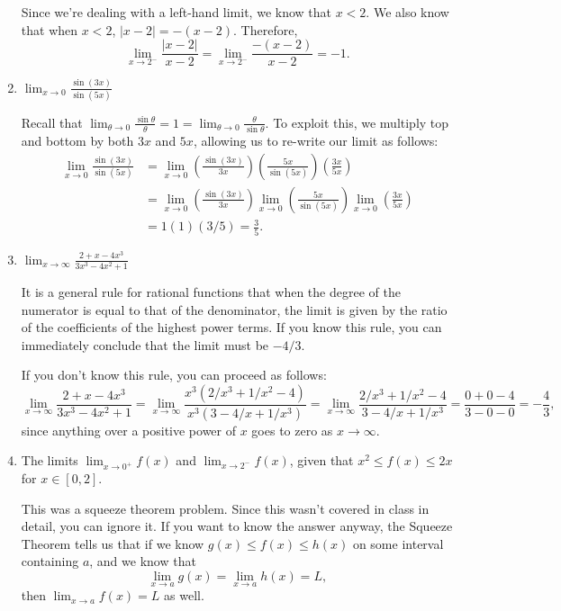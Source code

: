 \documentclass[12pt]{article}
\newcommand{\di}{\displaystyle}
\newcommand{\abs}[1]{\lvert #1\rvert}
\begin{document}
\begin{enumerate}
   Since we're dealing with a left-hand limit, we know that $x<2$. We also know that when $x<2$, $\abs{x-2}=-(x-2)$. Therefore,
   \[
   \lim_{x\to 2^-}\frac{\abs{x-2}}{x-2} = \lim_{x\to 2^-}\frac{-(x-2)}{x-2}=-1.
   \]
    
    \item $\di \lim_{x\to 0}\frac{\sin(3x)}{\sin(5x)}$
    
  Recall that $\di \lim_{\theta\to 0}\frac{\sin\theta}{\theta} = 1 = \lim_{\theta\to 0}\frac{\theta}{\sin\theta}$. To exploit this, we multiply top and bottom by both $3x$ and $5x$, allowing us to re-write our limit as follows:
  \begin{align*}
  \lim_{x\to 0}\frac{\sin(3x)}{\sin(5x)} &= \lim_{x\to 0}\left(\frac{\sin(3x)}{3x}\right)\left(\frac{5x}{\sin(5x)}\right)\left(\frac{3x}{5x}\right)\\
  & = \lim_{x\to 0}\left(\frac{\sin(3x)}{3x}\right)\lim_{x\to 0}\left(\frac{5x}{\sin(5x)}\right)\lim_{x\to 0}\left(\frac{3x}{5x}\right)\\
  & = 1(1)(3/5)=\frac35.
  \end{align*}
    
       
    \item $\di \lim_{x\to\infty}\frac{2+x-4x^3}{3x^3-4x^2+1}$
    
   It is a general rule for rational functions that when the degree of the numerator is equal to that of the denominator, the limit is given by the ratio of the coefficients of the highest power terms. If you know this rule, you can immediately conclude that the limit must be $-4/3$.
   
   If you don't know this rule, you can proceed as follows:
   \[
   \lim_{x\to\infty}\frac{2+x-4x^3}{3x^3-4x^2+1}=\lim_{x\to \infty}\frac{x^3(2/x^3+1/x^2-4)}{x^3(3-4/x+1/x^3)}=\lim_{x\to \infty}\frac{2/x^3+1/x^2-4}{3-4/x+1/x^3}=\frac{0+0-4}{3-0-0}=-\frac43,
   \]
   since anything over a positive power of $x$ goes to zero as $x\to \infty$.
    
    \item The limits $\di\lim_{x\to 0^+}f(x)$ and $\di \lim_{x\to 2^-}f(x)$, given that $x^2\leq f(x)\leq 2x$ for $x\in [0,2]$.
  

This was a squeeze theorem problem. Since this wasn't covered in class in detail, you can ignore it. If you want to know the answer anyway, the Squeeze Theorem tells us that if we know $g(x)\leq f(x)\leq h(x)$ on some interval containing $a$, and we know that
\[
\lim_{x\to a}g(x) = \lim_{x\to a}h(x)=L,
\]
then $\di\lim_{x\to a}f(x)=L$ as well.


\end{enumerate}
\end{document}
